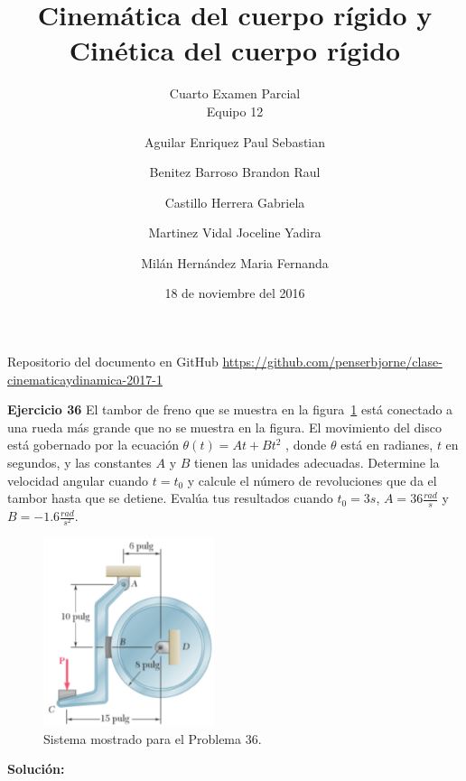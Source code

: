 \documentclass[a4paper,11pt]{scrartcl}
\title{Cinemática del cuerpo rígido y Cinética del cuerpo rígido}
\subtitle{Cuarto Examen Parcial \\ Equipo 12}
\author{
  Aguilar Enriquez Paul Sebastian\\
  \and
  Benitez Barroso Brandon Raul\\
  \and
  Castillo Herrera Gabriela\\
  \and
  Martinez Vidal Joceline Yadira\\
  \and
  Milán Hernández Maria Fernanda
  }
\date{18 de noviembre del 2016}
\begin{document}
\maketitle

\begin{center}
  Repositorio del documento en GitHub
  \url{https://github.com/penserbjorne/clase-cinematicaydinamica-2017-1}
\end{center}

\textbf{Ejercicio 36} El tambor de freno que se muestra en la  figura~\ref{fig:36_1} está conectado a una rueda más grande que no se muestra en la  figura. El movimiento del disco está gobernado por la ecuación $\theta(t) = At + Bt^{2}$ , donde $\theta$ está en radianes, $t$ en segundos, y las constantes $A$ y $B$ tienen las unidades adecuadas. Determine la velocidad angular cuando $t = t_{0}$ y calcule el número de  revoluciones  que  da  el  tambor  hasta  que  se  detiene.  Evalúa  tus  resultados  cuando $t_{0} = 3 s$, $A = 36 \frac{rad}{s}$ y $B = -1.6 \frac{rad}{s^{2}}$.\\

\begin{figure}[H]
  \centering
  \includegraphics[height=5.5cm]{36_1}
  \caption{Sistema mostrado para el Problema 36.}
  \label{fig:36_1}
\end{figure}

\textbf{Solución:}
\end{document}
